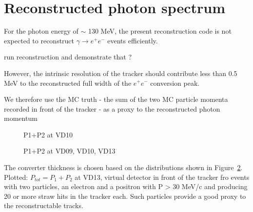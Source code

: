 \section{Reconstructed photon spectrum}

For the photon energy of $\sim$ 130 MeV, the present reconstruction code is not expected
to reconstruct $\gamma \to e^+e^-$ events efficiently.

{\red run reconstruction and demonstrate that ? }

However, the intrinsic resolution of the tracker should contribute less than 0.5 MeV to the
reconstructed full width of the $e^+e^-$ conversion peak.

We therefore use the MC truth - the sum of the two MC particle momenta recorded in front
of the tracker - as a proxy to the reconstructed photon momentum
\begin{figure}[H]
  \caption{
    \label{figure:sum_mom_vd10}
    P1+P2 at VD10
  }
\end{figure}

\begin{figure}[H]
  \caption{
    \label{figure:sum_mom_vd13}
    P1+P2 at VD09, VD10, VD13
  }
\end{figure}

The converter thickness is chosen based on the distributions shown in Figure~\ref{figure:sum_mom_vd13}.
Plotted: $P_{tot} = P_1 + P_2$ at VD13, virtual detector in front of the tracker fro events with
two particles, an electron and a positron with P > 30 MeV/c and producing 20 or more straw hits in the tracker each.
Such particles provide a good proxy to the reconstructable tracks.

